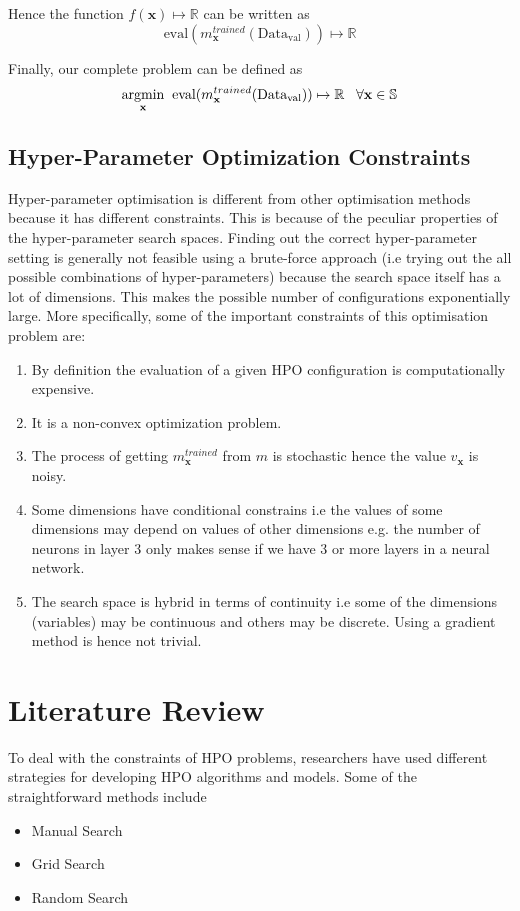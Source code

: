 \documentclass[11pt]{article}
\begin{document}
Hence the function $f(\textbf{x}) \mapsto \mathbb{R}$ can be written as 
$$
\textrm{eval}(m^{trained}_\textbf{x} (\textrm{Data}_\textrm{val})) \mapsto \mathbb{R}
$$

Finally,  our complete problem can be defined as
$$
\underset{\rm \textbf{x}}{\rm argmin} \;\; \textrm{eval}(m^{trained}_\textbf{x} (\textrm{Data}_\textrm{val})) \mapsto \mathbb{R}   \;\;\;  \forall \textbf{x} \in \mathbb{S}
$$

\label{ProblemOverviewlabel}
\subsection{Hyper-Parameter Optimization Constraints}

Hyper-parameter optimisation is different from other optimisation methods because it has different constraints.
This is because of the peculiar properties of the hyper-parameter search spaces.
Finding out the correct hyper-parameter setting is generally not feasible using a brute-force approach (i.e trying out the all possible combinations of hyper-parameters) because the search space itself has a lot of dimensions. 
This makes the possible number of configurations exponentially large.
More specifically,  some of the important constraints of this optimisation problem are:

\begin{enumerate}
\item By definition the evaluation of a given HPO configuration is computationally expensive.
\item It is a non-convex optimization problem.
\item The process of getting $m^{trained}_\textbf{x}$ from $m$ is stochastic hence the value $v_{\textbf{x}}$ is noisy.
\item Some dimensions have conditional constrains i.e the values of some dimensions may depend on values of other dimensions e.g.  the number of neurons in layer 3 only makes sense if we have 3 or more layers in a neural network.
\item The search space is hybrid in terms of continuity i.e some of the dimensions (variables) may be continuous and others may be discrete.
Using a gradient method is hence not trivial.
\end{enumerate}



\section{Literature Review}
To deal with the constraints of HPO problems, researchers have used different strategies for developing HPO algorithms and models.
Some of the straightforward methods include
\begin{itemize}
\item Manual Search
\item Grid Search
\item Random Search
\end{itemize}
\end{document}

